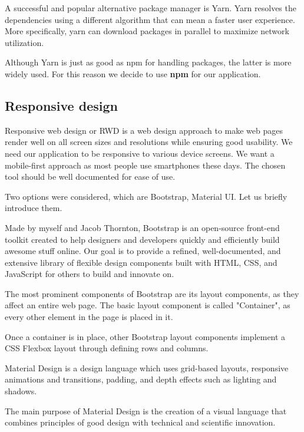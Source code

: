   A successful and popular alternative package manager is Yarn. 
  Yarn resolves the dependencies using a different algorithm that can mean a faster user experience.
  More specifically, yarn can download packages in parallel to maximize network utilization.

  Although Yarn is just as good as npm for handling packages, the latter is more widely used.
  For this reason we decide to use \textbf{npm} for our application. 

\subsection*{Responsive design}
  Responsive web design or RWD is a web design approach to make web pages render well on all screen sizes and resolutions while ensuring good usability.
  We need our application to be responsive to various device screens.
  We want a mobile-first approach as most people use smartphones these days.
  The chosen tool should be well documented for ease of use.

  Two options were considered, which are Bootstrap, Material UI.
  Let us briefly introduce them.

  Made by myself and Jacob Thornton, Bootstrap is an open-source front-end toolkit created to help designers and developers quickly and efficiently build awesome stuff online. Our goal is to provide a refined, well-documented, and extensive library of flexible design components built with HTML, CSS, and JavaScript for others to build and innovate on.

  The most prominent components of Bootstrap are its layout components, as they affect an entire web page. The basic layout component is called "Container", as every other element in the page is placed in it.

  Once a container is in place, other Bootstrap layout components implement a CSS Flexbox layout through defining rows and columns.

  Material Design is a design language which uses grid-based layouts, responsive animations and transitions, padding, and depth effects such as lighting and shadows.

  The main purpose of Material Design is the creation of a visual language that combines principles of good design with technical and scientific innovation. 

